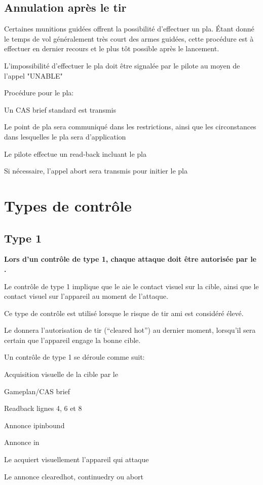 \subsection{Annulation après le tir}

Certaines munitions guidées offrent la possibilité d'effectuer un \gls{pla}. Étant donné le temps de vol généralement très court des armes guidées, cette procédure est à effectuer en dernier recours et le plus tôt possible après le lancement.

\e
	\item L'impossibilité d'effectuer le \gls{pla} doit être signalée par le pilote au moyen de l'appel "UNABLE"
	\item Procédure pour le \gls{pla}:
	\ee
		\item Un CAS brief standard est transmis
		\item Le point de \gls{pla} sera communiqué dans les restrictions, ainsi que les circonstances dans lesquelles le \gls{pla} sera d'application
		\item Le pilote effectue un read-back incluant le \gls{pla}
		\item Si nécessaire, l'appel \gls{abort} sera transmis pour initier le \gls{pla}
	\ed
\ed

\section{Types de contrôle}
\label{controltypes}

\e
    \item {}
\ed

\subsection{Type 1}
\e
    \item \textbf{Lors d'un contrôle de type 1, chaque attaque doit être autorisée par le \ja{}.}
    \item Le contrôle de type 1 implique que le \ja{} aie le contact visuel sur la cible, ainsi que le contact visuel sur l'appareil au moment de l'attaque.
    \item Ce type de contrôle est utilisé lorsque le risque de tir ami est considéré élevé.
    \item Le \ja{} donnera l'autorisation de tir (``cleared hot'') au dernier moment, lorsqu'il sera certain que l'appareil engage la bonne cible.
    \item Un contrôle de type 1 se déroule comme suit:
    \ee
        \item Acquisition visuelle de la cible par le \ja{}
        \item Gameplan/CAS brief
        \item Readback lignes 4, 6 et 8
        \item Annonce \acrshort{ipinbound}
        \item Annonce \acrshort{in}
        \item Le \ja{} acquiert visuellement l'appareil qui attaque
        \item Le \ja{} annonce \acrshort{clearedhot}, \acrshort{continuedry} ou \acrshort{abort}
    \ed
\ed

